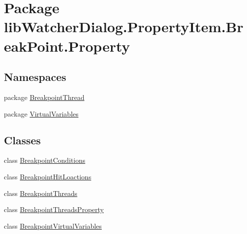 \hypertarget{namespacelib_watcher_dialog_1_1_property_item_1_1_break_point_1_1_property}{\section{Package lib\+Watcher\+Dialog.\+Property\+Item.\+Break\+Point.\+Property}
\label{namespacelib_watcher_dialog_1_1_property_item_1_1_break_point_1_1_property}
}
\subsection*{Namespaces}
\begin{DoxyCompactItemize}
\item 
package \hyperlink{namespacelib_watcher_dialog_1_1_property_item_1_1_break_point_1_1_property_1_1_breakpoint_thread}{Breakpoint\+Thread}
\item 
package \hyperlink{namespacelib_watcher_dialog_1_1_property_item_1_1_break_point_1_1_property_1_1_virtual_variables}{Virtual\+Variables}
\end{DoxyCompactItemize}
\subsection*{Classes}
\begin{DoxyCompactItemize}
\item 
class \hyperlink{classlib_watcher_dialog_1_1_property_item_1_1_break_point_1_1_property_1_1_breakpoint_conditions}{Breakpoint\+Conditions}
\item 
class \hyperlink{classlib_watcher_dialog_1_1_property_item_1_1_break_point_1_1_property_1_1_breakpoint_hit_loactions}{Breakpoint\+Hit\+Loactions}
\item 
class \hyperlink{classlib_watcher_dialog_1_1_property_item_1_1_break_point_1_1_property_1_1_breakpoint_threads}{Breakpoint\+Threads}
\item 
class \hyperlink{classlib_watcher_dialog_1_1_property_item_1_1_break_point_1_1_property_1_1_breakpoint_threads_property}{Breakpoint\+Threads\+Property}
\item 
class \hyperlink{classlib_watcher_dialog_1_1_property_item_1_1_break_point_1_1_property_1_1_breakpoint_virtual_variables}{Breakpoint\+Virtual\+Variables}
\end{DoxyCompactItemize}
